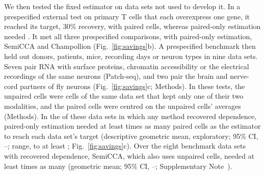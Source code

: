 \documentclass[pdflatex,sn-vancouver-num,iicol]{sn-jnl}
\begin{document}
We then tested the fixed estimator on \SyNTest{} data sets not used to develop it. In a prespecified external test on primary T cells that each overexpress one gene\cite{legut2022}, it reached its target, 30\% recovery, with \SpExCellsProposed{} paired cells, whereas paired-only estimation needed \SpExCellsPairedOnly. It met all three prespecified comparisons, with paired-only estimation, SemiCCA and Champollion (Fig.~\ref{fig:savings}b). A prespecified benchmark then held out donors, patients, mice, recording days or neuron types in nine data sets. Seven pair RNA with surface proteins, chromatin accessibility or the electrical recordings of the same neurons (Patch-seq), and two pair the brain and nerve-cord partners of fly neurons (Fig.~\ref{fig:savings}c; Methods). In these tests, the unpaired cells were cells of the same data set that kept only one of their two modalities, and the paired cells were centred on the unpaired cells' averages (Methods). In the \SyNInf{} of these \SyNTest{} data sets in which any method recovered dependence, paired-only estimation needed at least \SyGeo{} times as many paired cells as the estimator to reach each data set's target (descriptive geometric mean, exploratory; 95\% CI, \SyGeoLo--\SyGeoHi; range, \SyMin{} to at least \SyMax; Fig.~\ref{fig:savings}c). Over the eight benchmark data sets with recovered dependence, SemiCCA, which also uses unpaired cells, needed at least \GenGTwo{} times as many (geometric mean; 95\% CI, \GenGTwoLo--\GenGTwoHi; Supplementary Note~).
\end{document}
